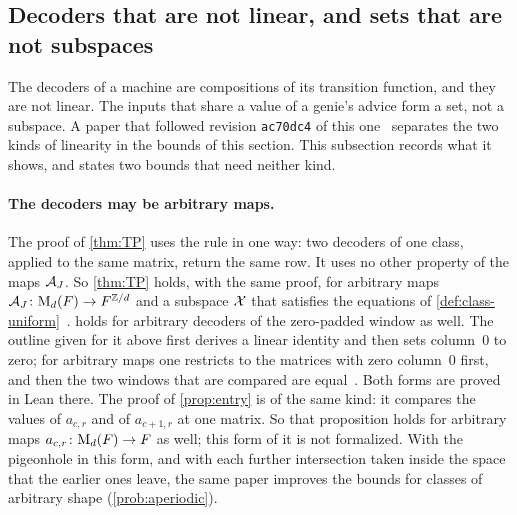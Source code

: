 \subsection{Decoders that are not linear, and sets that are not subspaces}\label{sec:sets}

The decoders of a machine are compositions of its transition function, and they are not linear. The inputs that share
a value of a genie's advice form a set, not a subspace. A paper that followed revision \texttt{ac70dc4} of this
one~\cite{SharedDecoders2026} separates the two kinds of linearity in the bounds of this section. This subsection
records what it shows, and states two bounds that need neither kind.

\paragraph{The decoders may be arbitrary maps.} The proof of \cref{thm:TP} uses the rule in one way: two decoders of one
class, applied to the same matrix, return the same row. It uses no other property of the maps $\mathcal{A}_J$. So
\cref{thm:TP} holds, with the same proof, for arbitrary maps $\mathcal{A}_J\colon\mathrm{M}_d(F)\to F^{\mathbb{Z}/d}$ and a subspace $\mathcal{X}$
that satisfies the equations of \cref{def:class-uniform}~\cite[Lemma~3.1]{SharedDecoders2026}. 
holds for arbitrary decoders of the zero-padded window as well. The outline given for it above first derives a linear
identity and then sets column~$0$ to zero; for arbitrary maps one restricts to the matrices with zero column~$0$
first, and then the two windows that are compared are equal~\cite[Theorem~A.4]{SharedDecoders2026}. Both forms are
proved in Lean there. The proof of
\cref{prop:entry} is of the same kind: it compares the values of $a_{c,r}$ and of $a_{c+1,r}$ at one matrix. So that
proposition holds for arbitrary maps $a_{c,r}\colon\mathrm{M}_d(F)\to F$ as well; this form of it is not formalized. With
the pigeonhole in this form, and with each further intersection taken inside the space that the earlier ones leave,
the same paper improves the bounds for classes of arbitrary shape (\cref{prob:aperiodic}).

